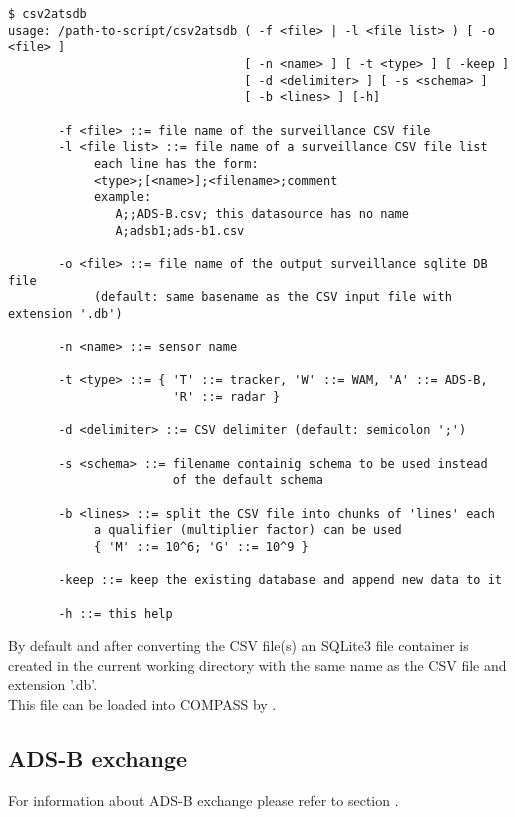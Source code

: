 \begin{lstlisting}
$ csv2atsdb
usage: /path-to-script/csv2atsdb ( -f <file> | -l <file list> ) [ -o <file> ]
                                 [ -n <name> ] [ -t <type> ] [ -keep ]
                                 [ -d <delimiter> ] [ -s <schema> ] 
                                 [ -b <lines> ] [-h]

       -f <file> ::= file name of the surveillance CSV file
       -l <file list> ::= file name of a surveillance CSV file list
            each line has the form:
            <type>;[<name>];<filename>;comment
            example:
               A;;ADS-B.csv; this datasource has no name
               A;adsb1;ads-b1.csv

       -o <file> ::= file name of the output surveillance sqlite DB file
            (default: same basename as the CSV input file with extension '.db')

       -n <name> ::= sensor name

       -t <type> ::= { 'T' ::= tracker, 'W' ::= WAM, 'A' ::= ADS-B, 
                       'R' ::= radar }

       -d <delimiter> ::= CSV delimiter (default: semicolon ';')

       -s <schema> ::= filename containig schema to be used instead
                       of the default schema

       -b <lines> ::= split the CSV file into chunks of 'lines' each
            a qualifier (multiplier factor) can be used
            { 'M' ::= 10^6; 'G' ::= 10^9 }

       -keep ::= keep the existing database and append new data to it

       -h ::= this help
\end{lstlisting}

By default and after converting the CSV file(s) an SQLite3 file container is created in the current working directory with the same name as the CSV file and extension '.db'. \\

This file can be loaded into COMPASS by .

\subsection{ADS-B exchange}

For information about ADS-B exchange please refer to section . \\

